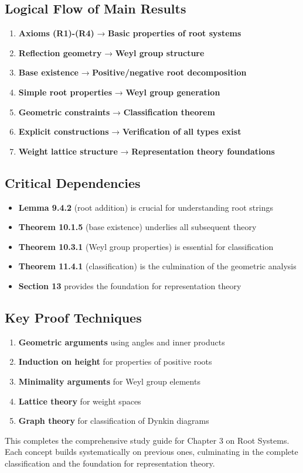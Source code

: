\subsection{Logical Flow of Main Results}

\begin{enumerate}
	\item \textbf{Axioms (R1)-(R4)} → \textbf{Basic properties of root systems}
	\item \textbf{Reflection geometry} → \textbf{Weyl group structure}
	\item \textbf{Base existence} → \textbf{Positive/negative root decomposition}
	\item \textbf{Simple root properties} → \textbf{Weyl group generation}
	\item \textbf{Geometric constraints} → \textbf{Classification theorem}
	\item \textbf{Explicit constructions} → \textbf{Verification of all types exist}
	\item \textbf{Weight lattice structure} → \textbf{Representation theory foundations}
\end{enumerate}

\subsection{Critical Dependencies}

\begin{itemize}
	\item \textbf{Lemma 9.4.2} (root addition) is crucial for understanding root strings
	\item \textbf{Theorem 10.1.5} (base existence) underlies all subsequent theory
	\item \textbf{Theorem 10.3.1} (Weyl group properties) is essential for classification
	\item \textbf{Theorem 11.4.1} (classification) is the culmination of the geometric analysis
	\item \textbf{Section 13} provides the foundation for representation theory
\end{itemize}

\subsection{Key Proof Techniques}

\begin{enumerate}
	\item \textbf{Geometric arguments} using angles and inner products
	\item \textbf{Induction on height} for properties of positive roots
	\item \textbf{Minimality arguments} for Weyl group elements
	\item \textbf{Lattice theory} for weight spaces
	\item \textbf{Graph theory} for classification of Dynkin diagrams
\end{enumerate}

This completes the comprehensive study guide for Chapter 3 on Root Systems. Each concept builds systematically on previous ones, culminating in the complete classification and the foundation for representation theory.
